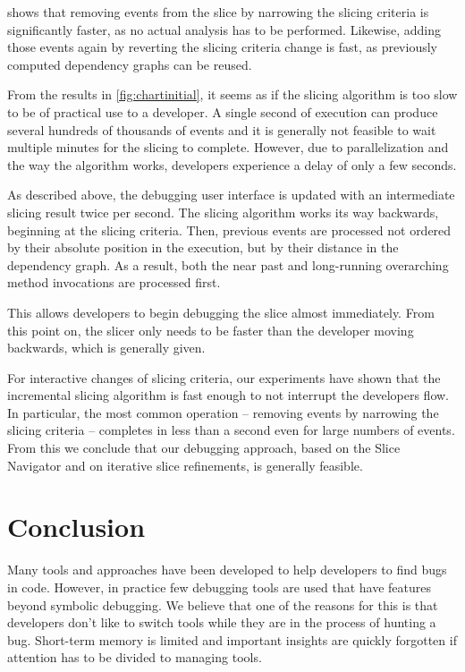 ﻿\documentclass[
      english,
			conference,
      ]{IEEEtran}
\begin{document}
 shows that removing events from the slice by narrowing the slicing criteria is significantly faster, as no actual analysis has to be performed.
Likewise, adding those events again by reverting the slicing criteria change is fast, as previously computed dependency graphs can be reused.

\medskip

From the results in \cref{fig:chartinitial}, it seems as if the slicing algorithm is too slow to be of practical use to a developer.
A single second of execution can produce several hundreds of thousands of events and it is generally not feasible to wait multiple minutes for the slicing to complete.
However, due to parallelization and the way the algorithm works, developers experience a delay of only a few seconds.

As described above, the debugging user interface is updated with an intermediate slicing result twice per second.
The slicing algorithm works its way backwards, beginning at the slicing criteria.
Then, previous events are processed not ordered by their absolute position in the execution, but by their distance in the dependency graph.
As a result, both the near past and long-running overarching method invocations are processed first.

This allows developers to begin debugging the slice almost immediately. 
From this point on, the slicer only needs to be faster than the developer moving backwards, which is generally given.

For interactive changes of slicing criteria, our experiments have shown that the incremental slicing algorithm is fast enough to not interrupt the developers flow.
In particular, the most common operation -- removing events by narrowing the slicing criteria -- completes in less than a second even for large numbers of events.
From this we conclude that our debugging approach, based on the Slice Navigator and on iterative slice refinements, is generally feasible.

\section{Conclusion}
\label{sec:conclusion}

Many tools and approaches have been developed to help developers to find bugs in code.
However, in practice few debugging tools are used that have features beyond symbolic debugging.
We believe that one of the reasons for this is that developers don't like to switch tools while they are in the process of hunting a bug.
Short-term memory is limited and important insights are quickly forgotten if attention has to be divided to managing tools.
\end{document}
